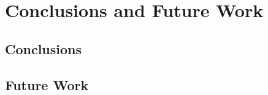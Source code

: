 \documentclass{scrartcl}
\begin{document}
%
%
%
% 



\section{Conclusions and Future Work}
\subsection{Conclusions}
   
    	\subsection{Future Work		}
    	


\newpage


\printbibliography[heading=bibintoc]


\pagebreak









  	
  
  	

  	
  	
  	
  
  	
  	
  	
  
  	
  	
  
  	


  	
\end{document}

